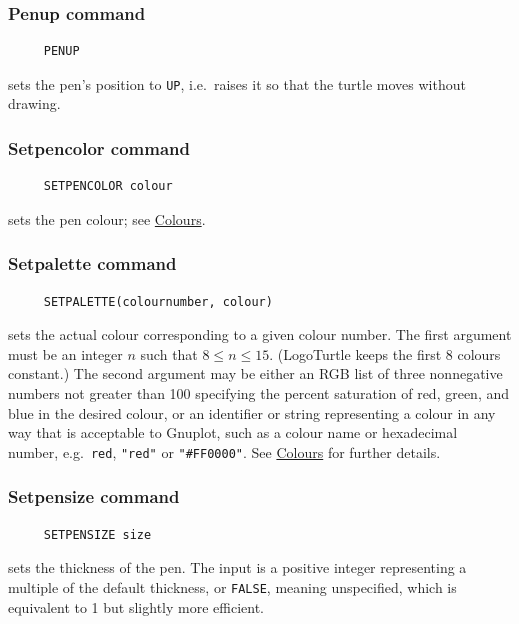 \subsubsection*{Penup command}
\begin{verbatim}
     PENUP
\end{verbatim}
sets the pen's position to \texttt{UP}, i.e.\ raises it so that the
turtle moves without drawing.

\subsubsection*{Setpencolor command}
\begin{verbatim}
     SETPENCOLOR colour
\end{verbatim}
\label{logoturtle:setpencolor}
sets the pen colour; see \hyperref[logoturtle:Colours]{Colours}.

\hypertarget{logoturtle:setpalette}{\subsubsection*{Setpalette command}}
\begin{verbatim}
     SETPALETTE(colournumber, colour)
\end{verbatim}
sets the actual colour corresponding to a given colour number.  The
first argument must be an integer $n$ such that $8 \le n \le
15$. (LogoTurtle keeps the first 8 colours constant.)  The second
argument may be either an RGB list of three nonnegative numbers not
greater than 100 specifying the percent saturation of red, green, and
blue in the desired colour, or an identifier or string representing a
colour in any way that is acceptable to Gnuplot, such as a colour name
or hexadecimal number, e.g.\ \texttt{red}, \texttt{"red"} or
\texttt{"\#FF0000"}.  See \hyperref[logoturtle:Colours]{Colours} for
further details.

\subsubsection*{Setpensize command}
\begin{verbatim}
     SETPENSIZE size
\end{verbatim}
sets the thickness of the pen.  The input is a positive integer
representing a multiple of the default thickness, or \texttt{FALSE},
meaning unspecified, which is equivalent to 1 but slightly
more efficient.

